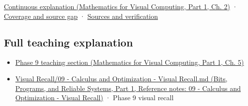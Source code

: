 \hypertarget{appendix-ab31ef447dbf-source-and-navigation}{}

\href{../02-Mathematics-for-Visual-Computing-P01/main.pdf\#nameddest=01-foundations-i-ch018-keep-the-promises-visible-while-moving-between-representations}{Continuous explanation (Mathematics for Visual Computing, Part 1, Ch. 2)} · \hyperref[appendix-fd090d982a15-phase-7---parts-601-700]{Coverage and source gap} · \hyperref[appendix-a103e7846d21-phase-7---source-analysis-and-verification]{Sources and verification}

\subsection{Full teaching explanation}\label{appendix-ab31ef447dbf-full-teaching-explanation}

\hypertarget{appendix-ab31ef447dbf-full-teaching-explanation}{}

\begin{itemize}
\tightlist
\item
  \href{../02-Mathematics-for-Visual-Computing-P01/main.pdf\#nameddest=02-foundations-ii-ch021-jacobians-curvature-and-local-approximation}{Phase 9 teaching section (Mathematics for Visual Computing, Part 1, Ch. 5)}
\item
  \href{../01-Bits-Programs-and-Reliable-Systems-P01/main.pdf\#nameddest=appendix-adf48f5dc5c1}{Visual Recall/09 - Calculus and Optimization - Visual Recall.md (Bits, Programs, and Reliable Systems, Part 1, Reference notes: 09 - Calculus and Optimization - Visual Recall)} · Phase 9 visual recall
\end{itemize}

